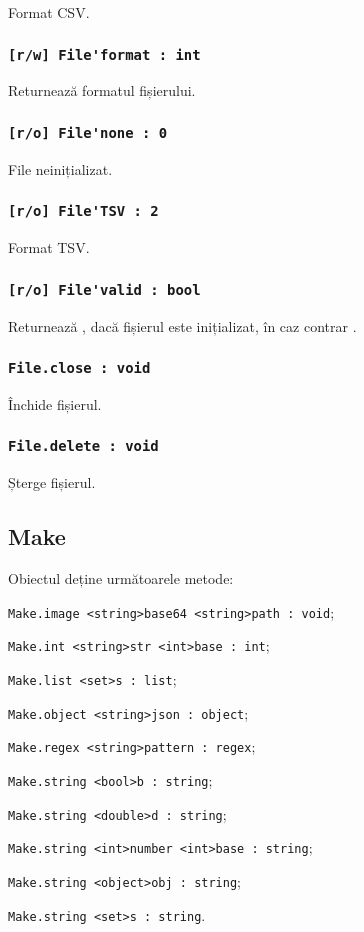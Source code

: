Format CSV.

\subsubsection{\lstinline|[r/w] File'format : int|}

Returnează formatul fișierului.

\subsubsection{\lstinline|[r/o] File'none : 0|}

File neinițializat.

\subsubsection{\lstinline|[r/o] File'TSV : 2|}

Format TSV.

\subsubsection{\lstinline|[r/o] File'valid : bool|}

Returnează \true, dacă fișierul este inițializat, în caz contrar \false.

\subsubsection{\lstinline|File.close : void|}

Închide fișierul.

\subsubsection{\lstinline|File.delete : void|}

Șterge fișierul.

\subsection{{\color{orange} Make}}

Obiectul \make{} deține următoarele metode:
\begin{icItems}
	\item \lstinline|Make.image <string>base64 <string>path : void|;
	\item \lstinline|Make.int <string>str <int>base : int|;
	\item \lstinline|Make.list <set>s : list|;
	\item \lstinline|Make.object <string>json : object|;
	\item \lstinline|Make.regex <string>pattern : regex|;
	\item \lstinline|Make.string <bool>b : string|;
	\item \lstinline|Make.string <double>d : string|;
	\item \lstinline|Make.string <int>number <int>base : string|;
	\item \lstinline|Make.string <object>obj : string|;
	\item \lstinline|Make.string <set>s : string|.
\end{icItems}

